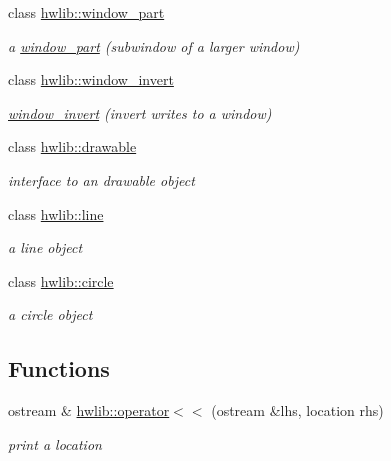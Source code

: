 \begin{DoxyCompactItemize}
class \hyperlink{classhwlib_1_1window__part}{hwlib\+::window\+\_\+part}
\begin{DoxyCompactList}\small\item\em a \hyperlink{classhwlib_1_1window__part}{window\+\_\+part} (subwindow of a larger window) \end{DoxyCompactList}\item 
class \hyperlink{classhwlib_1_1window__invert}{hwlib\+::window\+\_\+invert}
\begin{DoxyCompactList}\small\item\em \hyperlink{classhwlib_1_1window__invert}{window\+\_\+invert} (invert writes to a window) \end{DoxyCompactList}\item 
class \hyperlink{classhwlib_1_1drawable}{hwlib\+::drawable}
\begin{DoxyCompactList}\small\item\em interface to an drawable object \end{DoxyCompactList}\item 
class \hyperlink{classhwlib_1_1line}{hwlib\+::line}
\begin{DoxyCompactList}\small\item\em a line object \end{DoxyCompactList}\item 
class \hyperlink{classhwlib_1_1circle}{hwlib\+::circle}
\begin{DoxyCompactList}\small\item\em a circle object \end{DoxyCompactList}\end{DoxyCompactItemize}
\subsection*{Functions}
\begin{DoxyCompactItemize}
\item 
ostream \& \hyperlink{hwlib-graphics_8hpp_a72b3cd9bbd35ce5a8495b33af557d4ca}{hwlib\+::operator$<$$<$} (ostream \&lhs, location rhs)\hypertarget{hwlib-graphics_8hpp_a72b3cd9bbd35ce5a8495b33af557d4ca}{}\label{hwlib-graphics_8hpp_a72b3cd9bbd35ce5a8495b33af557d4ca}

\begin{DoxyCompactList}\small\item\em print a location \end{DoxyCompactList}\end{DoxyCompactItemize}
